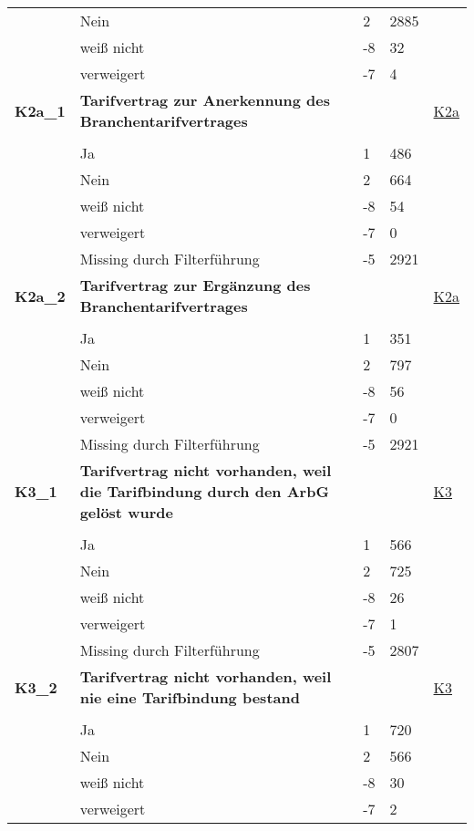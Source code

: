 \begin{longtable}{| L{2.5cm} | L{8.25cm}| C{1.5cm} | R{1.25cm} | C{2.25cm} |  }
   & Nein & 2 & 2885 &  \\ 
   & weiß nicht & -8 & 32 &  \\ 
   & verweigert & -7 & 4 &  \\ 
   \midrule
\textbf{K2a\_1}\label{var:suf:K2a:1} & \textbf{Tarifvertrag zur Anerkennung des Branchentarifvertrages} &  &  & \hyperref[K2a]{K2a} \\ 
   &  &  &  &  \\ 
   & Ja & 1 & 486 &  \\ 
   & Nein & 2 & 664 &  \\ 
   & weiß nicht & -8 & 54 &  \\ 
   & verweigert & -7 & 0 &  \\ 
   & Missing durch Filterführung & -5 & 2921 &  \\ 
   \midrule
\textbf{K2a\_2}\label{var:suf:K2a:2} & \textbf{Tarifvertrag zur Ergänzung des Branchentarifvertrages} &  &  & \hyperref[K2a]{K2a} \\ 
   &  &  &  &  \\ 
   & Ja & 1 & 351 &  \\ 
   & Nein & 2 & 797 &  \\ 
   & weiß nicht & -8 & 56 &  \\ 
   & verweigert & -7 & 0 &  \\ 
   & Missing durch Filterführung & -5 & 2921 &  \\ 
   \midrule
\textbf{K3\_1}\label{var:suf:K3:1} & \textbf{Tarifvertrag nicht vorhanden, weil die Tarifbindung durch den ArbG gelöst wurde} &  &  & \hyperref[K3]{K3} \\ 
   &  &  &  &  \\ 
   & Ja & 1 & 566 &  \\ 
   & Nein & 2 & 725 &  \\ 
   & weiß nicht & -8 & 26 &  \\ 
   & verweigert & -7 & 1 &  \\ 
   & Missing durch Filterführung & -5 & 2807 &  \\ 
   \midrule
\textbf{K3\_2}\label{var:suf:K3:2} & \textbf{Tarifvertrag nicht vorhanden, weil nie eine Tarifbindung bestand} &  &  & \hyperref[K3]{K3} \\ 
   &  &  &  &  \\ 
   & Ja & 1 & 720 &  \\ 
   & Nein & 2 & 566 &  \\ 
   & weiß nicht & -8 & 30 &  \\ 
   & verweigert & -7 & 2 &  \\ 

\end{longtable}

